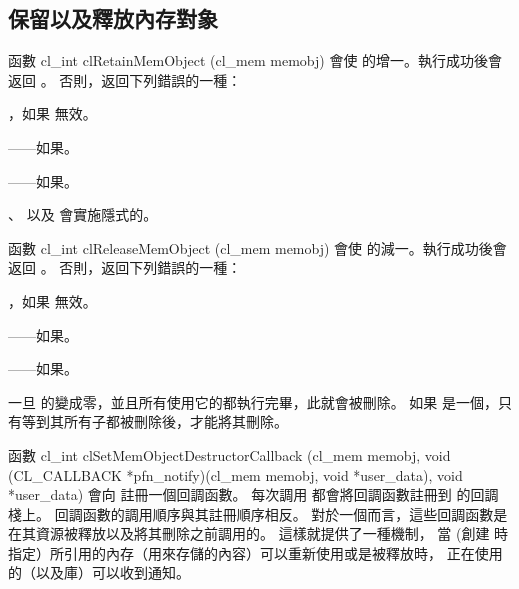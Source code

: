 \subsection{保留以及釋放內存對象}

函數
\startclc
cl_int clRetainMemObject (cl_mem memobj)
\stopclc
會使  的增一。執行成功後會返回 。
否則，返回下列錯誤的一種：
\startigBase
\item {}，如果  無效。

\item {}——如果\scdevfailres。

\item {}——如果\schostfailres。
\stopigBase

、  以及  會實施隱式的。

函數
\startclc
cl_int clReleaseMemObject (cl_mem memobj)
\stopclc
會使  的減一。執行成功後會返回 。
否則，返回下列錯誤的一種：
\startigBase
\item {}，如果  無效。

\item {}——如果\scdevfailres。

\item {}——如果\schostfailres。
\stopigBase

一旦  的變成零，並且所有使用它的都執行完畢，此就會被刪除。
如果  是一個，只有等到其所有子都被刪除後，才能將其刪除。

函數
\startclc
cl_int clSetMemObjectDestructorCallback (cl_mem memobj,
		void (CL_CALLBACK *pfn_notify)(cl_mem memobj,
			void *user_data),
		void *user_data)
\stopclc
會向  註冊一個回調函數。
每次調用  都會將回調函數註冊到  的回調棧上。
回調函數的調用順序與其註冊順序相反。
對於一個而言，這些回調函數是在其資源被釋放以及將其刪除之前調用的。
這樣就提供了一種機制，
當  (創建  時指定）所引用的內存（用來存儲的內容）可以重新使用或是被釋放時，
正在使用  的（以及庫）可以收到通知。

